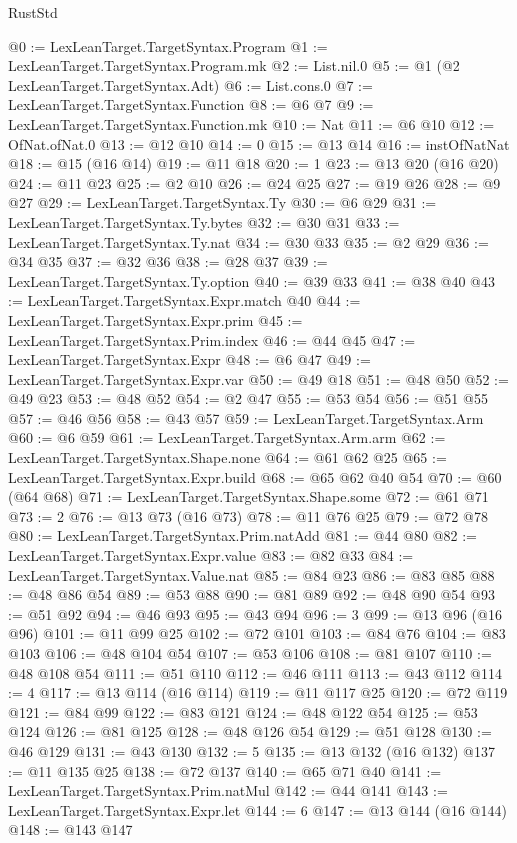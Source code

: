 \begin{lexlean}{RustStd}
\begin{coremodule}
{\begin{coremodule}
{{{{{@0 := LexLeanTarget.TargetSyntax.Program
@1 := LexLeanTarget.TargetSyntax.Program.mk
@2 := List.nil.{0}
@5 := @1 (@2 LexLeanTarget.TargetSyntax.Adt)
@6 := List.cons.{0}
@7 := LexLeanTarget.TargetSyntax.Function
@8 := @6 @7
@9 := LexLeanTarget.TargetSyntax.Function.mk
@10 := Nat
@11 := @6 @10
@12 := OfNat.ofNat.{0}
@13 := @12 @10
@14 := 0
@15 := @13 @14
@16 := instOfNatNat
@18 := @15 (@16 @14)
@19 := @11 @18
@20 := 1
@23 := @13 @20 (@16 @20)
@24 := @11 @23
@25 := @2 @10
@26 := @24 @25
@27 := @19 @26
@28 := @9 @27
@29 := LexLeanTarget.TargetSyntax.Ty
@30 := @6 @29
@31 := LexLeanTarget.TargetSyntax.Ty.bytes
@32 := @30 @31
@33 := LexLeanTarget.TargetSyntax.Ty.nat
@34 := @30 @33
@35 := @2 @29
@36 := @34 @35
@37 := @32 @36
@38 := @28 @37
@39 := LexLeanTarget.TargetSyntax.Ty.option
@40 := @39 @33
@41 := @38 @40
@43 := LexLeanTarget.TargetSyntax.Expr.match @40
@44 := LexLeanTarget.TargetSyntax.Expr.prim
@45 := LexLeanTarget.TargetSyntax.Prim.index
@46 := @44 @45
@47 := LexLeanTarget.TargetSyntax.Expr
@48 := @6 @47
@49 := LexLeanTarget.TargetSyntax.Expr.var
@50 := @49 @18
@51 := @48 @50
@52 := @49 @23
@53 := @48 @52
@54 := @2 @47
@55 := @53 @54
@56 := @51 @55
@57 := @46 @56
@58 := @43 @57
@59 := LexLeanTarget.TargetSyntax.Arm
@60 := @6 @59
@61 := LexLeanTarget.TargetSyntax.Arm.arm
@62 := LexLeanTarget.TargetSyntax.Shape.none
@64 := @61 @62 @25
@65 := LexLeanTarget.TargetSyntax.Expr.build
@68 := @65 @62 @40 @54
@70 := @60 (@64 @68)
@71 := LexLeanTarget.TargetSyntax.Shape.some
@72 := @61 @71
@73 := 2
@76 := @13 @73 (@16 @73)
@78 := @11 @76 @25
@79 := @72 @78
@80 := LexLeanTarget.TargetSyntax.Prim.natAdd
@81 := @44 @80
@82 := LexLeanTarget.TargetSyntax.Expr.value
@83 := @82 @33
@84 := LexLeanTarget.TargetSyntax.Value.nat
@85 := @84 @23
@86 := @83 @85
@88 := @48 @86 @54
@89 := @53 @88
@90 := @81 @89
@92 := @48 @90 @54
@93 := @51 @92
@94 := @46 @93
@95 := @43 @94
@96 := 3
@99 := @13 @96 (@16 @96)
@101 := @11 @99 @25
@102 := @72 @101
@103 := @84 @76
@104 := @83 @103
@106 := @48 @104 @54
@107 := @53 @106
@108 := @81 @107
@110 := @48 @108 @54
@111 := @51 @110
@112 := @46 @111
@113 := @43 @112
@114 := 4
@117 := @13 @114 (@16 @114)
@119 := @11 @117 @25
@120 := @72 @119
@121 := @84 @99
@122 := @83 @121
@124 := @48 @122 @54
@125 := @53 @124
@126 := @81 @125
@128 := @48 @126 @54
@129 := @51 @128
@130 := @46 @129
@131 := @43 @130
@132 := 5
@135 := @13 @132 (@16 @132)
@137 := @11 @135 @25
@138 := @72 @137
@140 := @65 @71 @40
@141 := LexLeanTarget.TargetSyntax.Prim.natMul
@142 := @44 @141
@143 := LexLeanTarget.TargetSyntax.Expr.let
@144 := 6
@147 := @13 @144 (@16 @144)
@148 := @143 @147
}}}}}
\end{coremodule}}
\end{coremodule}
\end{lexlean}
